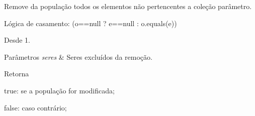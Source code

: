 Remove da população todos os elementos não pertencentes a coleção parâmetro. 

Lógica de casamento\-: (o==null ? e==null \-: o.\-equals(e)) 

\begin{DoxySince}{Desde}
1. 
\end{DoxySince}

\begin{DoxyParams}{Parâmetros}
{\em seres} & Seres excluídos da remoção. \\
\hline
\end{DoxyParams}
\begin{DoxyReturn}{Retorna}

\begin{DoxyItemize}
\item true\-: se a população for modificada; 
\item false\-: caso contrário; 
\end{DoxyItemize}
\end{DoxyReturn}

